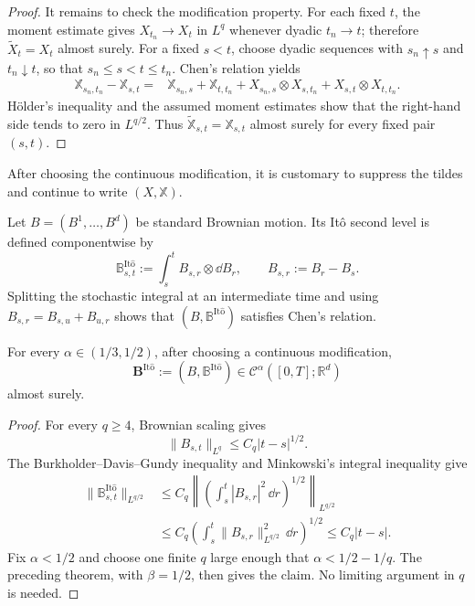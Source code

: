 \begin{proof}
It remains to check the modification property.  For each fixed $t$, the
moment estimate gives $X_{t_n}\to X_t$ in $L^q$ whenever dyadic $t_n\to t$;
therefore $\widetilde X_t=X_t$ almost surely.  For a fixed $s<t$, choose dyadic sequences with
$s_n\uparrow s$ and $t_n\downarrow t$, so that
$s_n\le s<t\le t_n$.  Chen's relation yields
\begin{align*}
\mathbb X_{s_n,t_n}-\mathbb X_{s,t}
={}&\mathbb X_{s_n,s}+\mathbb X_{t,t_n}
 +X_{s_n,s}\otimes X_{s,t_n}
 +X_{s,t}\otimes X_{t,t_n}.
\end{align*}
Hölder's inequality and the assumed moment estimates show that the right-hand
side tends to zero in $L^{q/2}$.  Thus
$\widetilde{\mathbb X}_{s,t}=\mathbb X_{s,t}$ almost surely for every fixed
pair $(s,t)$.
\end{proof}

\begin{remark}
After choosing the continuous modification, it is customary to suppress the
tildes and continue to write $(X,\mathbb X)$.
\end{remark}

Let $B=(B^1,\ldots,B^d)$ be standard Brownian motion.  Its It\^o second level
is defined componentwise by
\[
  \mathbb B^{\mathrm{It\hat{o}}}_{s,t}
  :=\int_s^t B_{s,r}\otimes\dd B_r,
  \qquad B_{s,r}:=B_r-B_s.
\]
Splitting the stochastic integral at an intermediate time and using
$B_{s,r}=B_{s,u}+B_{u,r}$ shows that
$(B,\mathbb B^{\mathrm{It\hat{o}}})$ satisfies Chen's relation.

\begin{prop}
For every $\alpha\in(1/3,1/2)$, after choosing a continuous modification,
\[
  \mathbf B^{\mathrm{It\hat{o}}}
  :=(B,\mathbb B^{\mathrm{It\hat{o}}})
  \in\mathscr C^\alpha([0,T];\mathbb R^d)
\]
almost surely.
\end{prop}

\begin{proof}
For every $q\ge4$, Brownian scaling gives
\[
  \|B_{s,t}\|_{L^q}\le C_q|t-s|^{1/2}.
\]
The Burkholder--Davis--Gundy inequality and Minkowski's integral inequality
give
\begin{align*}
\|\mathbb B^{\mathrm{It\hat{o}}}_{s,t}\|_{L^{q/2}}
&\le C_q
 \left\|\left(\int_s^t|B_{s,r}|^2\,\dd r\right)^{1/2}
 \right\|_{L^{q/2}}\\
&\le C_q\left(\int_s^t\|B_{s,r}\|_{L^{q/2}}^2\,\dd r\right)^{1/2}
 \le C_q|t-s|.
\end{align*}
Fix $\alpha<1/2$ and choose one finite $q$ large enough that
$\alpha<1/2-1/q$.  The preceding theorem, with $\beta=1/2$, then gives the
claim.  No limiting argument in $q$ is needed.
\end{proof}

